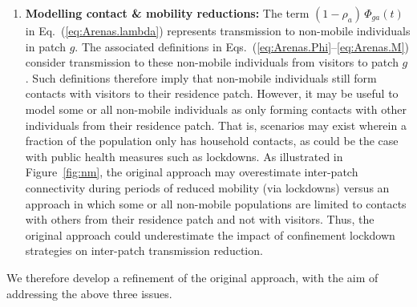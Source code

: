 \begin{enumerate}
  \item \textbf{Modelling contact \& mobility reductions:}\label{issue:mobility}
  The term $(1-\rho_a)\,\Phi_{ga}(t)$ in Eq.~(\ref{eq:Arenas.lambda})
  represents transmission to non-mobile individuals in patch $g$.
  The associated definitions in Eqs.~(\ref{eq:Arenas.Phi}--\ref{eq:Arenas.M})
  consider transmission to these non-mobile individuals from visitors to patch $g$.
  Such definitions therefore imply that
  non-mobile individuals still form contacts with visitors to their residence patch.
  However, it may be useful to model some or all non-mobile individuals
  as only forming contacts with other individuals from their residence patch.
  That is, scenarios may exist wherein a fraction of the population only has
  household contacts, as could be the case with public health measures such as lockdowns.
  As illustrated in Figure~\ref{fig:nm}, the original approach may
  overestimate inter-patch connectivity during periods of reduced mobility (via lockdowns)
  versus an approach in which some or all non-mobile populations are limited to
  contacts with others from their residence patch and not with visitors.
  Thus, the original approach \cite{Arenas2020} could underestimate
  the impact of confinement lockdown strategies on inter-patch transmission reduction.
\end{enumerate}
We therefore develop a refinement of the original approach,
with the aim of addressing the above three issues.
